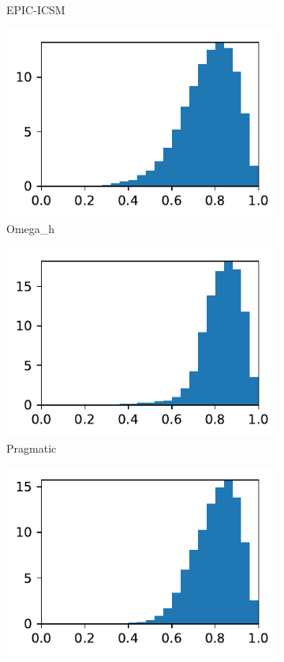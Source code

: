 \documentclass[3p,times,procedia,number]{elsarticle}
\begin{document}
\begin{figure}
\begin{subfigure}{.16\textwidth}
\caption{EPIC-ICSM}
\end{subfigure}
\begin{subfigure}{.16\textwidth}
\centering
\includegraphics[width=\textwidth]{omega_h-cube-cylinder-polar-2-quality.pdf}
\caption{Omega\_h}
\end{subfigure}
\begin{subfigure}{.16\textwidth}
\centering
\includegraphics[width=\textwidth]{pragmatic-cube-cylinder-polar-2-quality.pdf}
\caption{Pragmatic}
\end{subfigure}
\begin{subfigure}{.16\textwidth}
\centering
\includegraphics[width=\textwidth]{fefloa-cube-cylinder-polar-2-quality.pdf}

\end{subfigure}
\end{figure}
\end{document}
